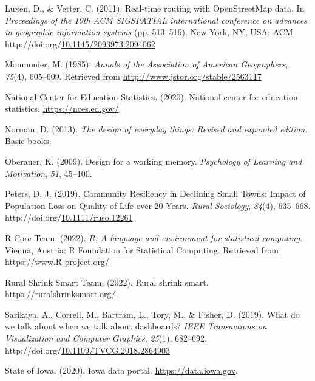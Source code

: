 \documentclass[print]{nuthesis}
\newlength{\cslhangindent}
\newenvironment{CSLReferences}[2]%
{\setlength{\parindent}{0pt}%
\everypar{\setlength{\hangindent}{\cslhangindent}}\ignorespaces}%
{\par}
\begin{document}
\begin{CSLReferences}{1}{0}
\leavevmode{}%
Luxen, D., \& Vetter, C. (2011). Real-time routing with OpenStreetMap data. In \emph{Proceedings of the 19th ACM SIGSPATIAL international conference on advances in geographic information systems} (pp. 513--516). New York, NY, USA: ACM. http://doi.org/\href{https://doi.org/10.1145/2093973.2094062}{10.1145/2093973.2094062}

\leavevmode{}%
Monmonier, M. (1985). \emph{Annals of the Association of American Geographers}, \emph{75}(4), 605--609. Retrieved from \url{http://www.jstor.org/stable/2563117}

\leavevmode{}%
National Center for Education Statistics. (2020). National center for education statistics. \url{https://nces.ed.gov/}.

\leavevmode{}%
Norman, D. (2013). \emph{The design of everyday things: Revised and expanded edition}. Basic books.

\leavevmode{}%
Oberauer, K. (2009). Design for a working memory. \emph{Psychology of Learning and Motivation}, \emph{51}, 45--100.

\leavevmode{}%
Peters, D. J. (2019). Community {Resiliency} in {Declining} {Small} {Towns}: {Impact} of {Population} {Loss} on {Quality} of {Life} over 20 {Years}. \emph{Rural Sociology}, \emph{84}(4), 635--668. http://doi.org/\href{https://doi.org/10.1111/ruso.12261}{10.1111/ruso.12261}

\leavevmode{}%
R Core Team. (2022). \emph{R: A language and environment for statistical computing}. Vienna, Austria: R Foundation for Statistical Computing. Retrieved from \url{https://www.R-project.org/}

\leavevmode{}%
Rural Shrink Smart Team. (2022). Rural shrink smart. \url{https://ruralshrinksmart.org/}.

\leavevmode{}%
Sarikaya, A., Correll, M., Bartram, L., Tory, M., \& Fisher, D. (2019). What do we talk about when we talk about dashboards? \emph{IEEE Transactions on Visualization and Computer Graphics}, \emph{25}(1), 682--692. http://doi.org/\href{https://doi.org/10.1109/TVCG.2018.2864903}{10.1109/TVCG.2018.2864903}

\leavevmode{}%
State of Iowa. (2020). Iowa data portal. \url{https://data.iowa.gov}.


\end{CSLReferences}
\end{document}
